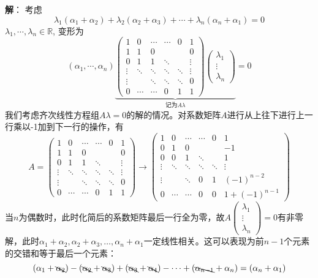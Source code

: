{\bf 解}： 考虑
$$\lambda_1 (\alpha_1+\alpha_2) + \lambda_2 (\alpha_2+\alpha_3) + \cdots + \lambda_n (\alpha_n+\alpha_1) = 0$$
$\lambda_1, \cdots, \lambda_n\in\mathbb{R}$, 变形为
$$(\alpha_1, \cdots, \alpha_n)
\underbrace{\begin{pmatrix}
1 & 0 & \cdots & \cdots & 0 & 1 \\
1 & 1 & 0 & & & 0 \\
0 & 1 & 1 & \ddots & & \vdots \\
\vdots & \ddots & \ddots & \ddots & \ddots & \vdots \\
\vdots & & \ddots & \ddots & \ddots & 0 \\
0 & \cdots & \cdots & 0 & 1 & 1
\end{pmatrix}
\begin{pmatrix}
\lambda_1 \\ \vdots \\ \lambda_n
\end{pmatrix}
}_{\text{记为} A \lambda}= 0
$$
我们考虑齐次线性方程组$A\lambda = 0$的解的情况。对系数矩阵$A$进行从上往下进行上一行乘以-1加到下一行的操作，有
$$
A = \begin{pmatrix}
1 & 0 & \cdots & \cdots & 0 & 1 \\
1 & 1 & 0 & & & 0 \\
0 & 1 & 1 & \ddots & & \vdots \\
\vdots & \ddots & \ddots & \ddots & \ddots & \vdots \\
\vdots & & \ddots & \ddots & \ddots & 0 \\
0 & \cdots & \cdots & 0 & 1 & 1
\end{pmatrix}
\to
\begin{pmatrix}
1 & 0 & \cdots & \cdots & 0 & 1 \\
0 & 1 & 0 & & & -1 \\
0 & 0 & 1 & \ddots & & 1 \\
\vdots & \ddots & \ddots & \ddots & \ddots & \vdots \\
\vdots & & \ddots & 0 & 1 & (-1)^{n-2} \\
0 & \cdots & \cdots & 0 & 0 & 1 + (-1)^{n-1}
\end{pmatrix}
$$
当$n$为偶数时，此时化简后的系数矩阵最后一行全为零，故$A\begin{pmatrix}
\lambda_1 \\ \vdots \\ \lambda_n
\end{pmatrix} = 0$有非零解，此时$\alpha_1+\alpha_2, \alpha_2+\alpha_3, \ldots, \alpha_n+\alpha_1$一定线性相关。这可以表现为前$n-1$个元素的交错和等于最后一个元素：
$$(\alpha_1+\bcancel{\alpha_2}) - (\bcancel{\alpha_2}+\bcancel{\alpha_3}) + (\bcancel{\alpha_3}+\bcancel{\alpha_4}) - \cdots + (\bcancel{\alpha_{n-1}} + \alpha_n) =  (\alpha_n+\alpha_1)$$

